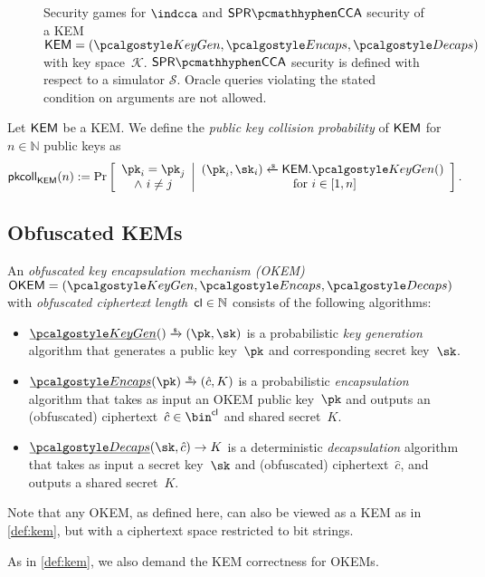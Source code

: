 \begin{figure}
    
    \caption[
        Security games for $\indcca$ and $\sprcca$ security of a KEM or obfuscated KEM.
    ]{
        Security games for $\indcca$ and $\sprcca$ security of a KEM~$\KEM = (\kgen, \encaps, \decaps)$ with key space~$\mathcal K$. $\sprcca$ security is defined with respect to a simulator $\mathcal S$. Oracle queries violating the stated condition on arguments are not allowed.
    }
    \label{fig:kem-security}
\end{figure}

\begin{definition}
    \label{def:pk-collisions}
    Let $\mathsf{KEM}$ be a KEM.
    We define the \emph{public key collision probability} of $\mathsf{KEM}$ for $n \in \mathbb{N}$ public keys as
    \[
        \pkcoll{\KEM}(n) := \Pr\left[
            \begin{array}{c}
                \pk_i = \pk_j \\
                \land~ i \neq j
            \end{array}
            \middle|
            \begin{array}{c}
                (\pk_i,\sk_i) \getsr \KEM.\kgen() \\
                \text{ for } i \in [1,n]
            \end{array}
            \right].
    \]
\end{definition}

\subsection{Obfuscated KEMs}

\begin{definition}
    \label{def:okem}
    An \emph{obfuscated key encapsulation mechanism (OKEM)} $\OKEM = (\kgen, \encaps, \decaps)$ with \emph{obfuscated ciphertext length}~$\mathsf{cl} \in \mathbb{N}$ consists of the following algorithms:
    \begin{itemize}
        \item $\ul{\kgen}() \tor (\pk,\sk)$ is a probabilistic \emph{key generation} algorithm that generates a public key~$\pk$ and corresponding secret key~$\sk$.

        \item $\ul{\encaps}(\pk) \tor (\hat c, K)$ is a probabilistic \emph{encapsulation} algorithm that takes as input an OKEM public key~$\pk$ and outputs an (obfuscated) ciphertext~$\hat c \in \bin^\obfctxtlen$ and shared secret~$K$.

        \item $\ul{\decaps}(\sk,\hat c) \to K$ is a deterministic \emph{decapsulation} algorithm that takes as input a secret key~$\sk$ and (obfuscated) ciphertext~$\hat c$, and outputs a shared secret~$K$.
    \end{itemize}
    Note that any OKEM, as defined here, can also be viewed as a KEM as in \cref{def:kem}, but with a ciphertext space restricted to bit strings.

    As in \cref{def:kem}, we also demand the KEM correctness for OKEMs.
\end{definition}


